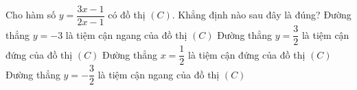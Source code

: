 \begin{ex}%
	Cho hàm số $y = \dfrac{3x - 1}{2x - 1}$ có đồ thị $(C)$. Khẳng định nào sau đây là đúng?
	\choice
	{Đường thẳng $y = -3$ là tiệm cận ngang của đồ thị $(C)$}
	{Đường thẳng $y = \dfrac{3}{2}$ là tiệm cận đứng của đồ thị $(C)$}
	{\True Đường thẳng $x = \dfrac{1}{2}$ là tiệm cận đứng của đồ thị $(C)$}
	{Đường thẳng $y = -\dfrac{3}{2}$ là tiệm cận ngang của đồ thị $(C)$}
\end{ex}


